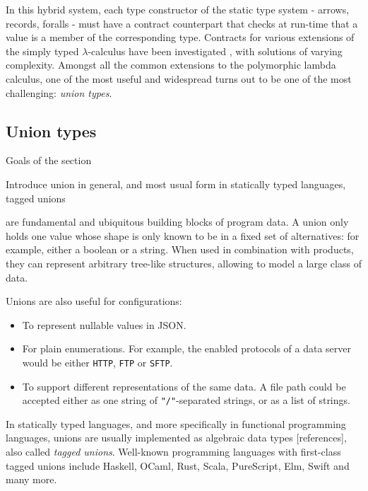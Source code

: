 In this hybrid system, each type constructor of the static type system - arrows,
records, foralls - must have a contract counterpart that checks at run-time that
a value is a member of the corresponding type. Contracts for various
extensions of the simply typed $\lambda$-calculus have been investigated
\cite{BlameForAll, KeilThiemannUnionIntersection, RootCauseOfBlame,
DependentContracts, GradualTypingClasses}, with solutions of varying complexity.
Amongst all the common extensions to the polymorphic lambda calculus, one of the
most useful and widespread turns out to be one of the most challenging:
\emph{union types}.

\subsection{Union types}
{\color{red}Goals of the section

Introduce union in general, and most usual form in statically typed languages, tagged unions\vspace{0.5cm}}

 are fundamental and ubiquitous building blocks of program data. A union
only holds one value whose shape is only known to be in a fixed set of
alternatives: for example, either a boolean or a string. When used in combination
with products, they can represent arbitrary tree-like structures, allowing to
model a large class of data.

Unions are also useful for configurations:
\begin{itemize}
    \item To represent nullable values in JSON.
    \item For plain enumerations. For example, the enabled protocols of a data server
        would be either \lstinline+HTTP+, \lstinline+FTP+ or \lstinline+SFTP+.
    \item To support different representations of the same data. A file path could be
        accepted either as one string of \lstinline+"/"+-separated strings, or
        as a list of strings.
\end{itemize}

In statically typed languages, and more specifically in functional programming
languages, unions are usually implemented as algebraic data
types [references],
also called \emph{tagged unions}. Well-known programming languages with
first-class tagged unions include Haskell, OCaml, Rust, Scala, PureScript, Elm,
Swift and many more.

